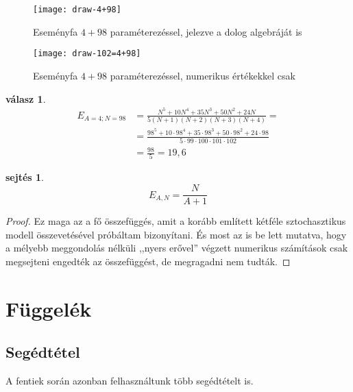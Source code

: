 \documentclass{article}
\newtheorem{answer}{válasz}
\newtheorem{conjecture}{sejtés}
\newcommand{\parenthesed}[1]{\left(#1\right)}
\begin{document}
	\begin{figure}[H]
		\caption*{Eseményfa $4+98$ paraméterezéssel, jelezve a dolog algebráját is}
		\centering
		\texttt{[image: draw-4+98]}
	\end{figure}

	\begin{figure}[H]
		\caption*{Eseményfa $4+98$ paraméterezéssel, numerikus értékekkel csak}
		\centering
		\texttt{[image: draw-102=4+98]}
	\end{figure}

	\begin{answer}
		\begin{align*}
			E_{A=4;N=98} &= \frac{N^5 + 10N^4 + 35N^3 +50N^2 + 24N}{5\parenthesed{N+1}\parenthesed{N+2}\parenthesed{N+3}\parenthesed{N+4}} =\\
			             &= \frac{98^5 + 10\cdot98^4 + 35\cdot98^3 +50\cdot98^2 + 24\cdot98}{5\cdot99\cdot100\cdot101\cdot102}\\
			             &= \frac{98}5 = 19,6
		\end{align*}
	\end{answer}

	\begin{conjecture}
		\[
			E_{A,N} = \frac N{A+1}
		\]
	\end{conjecture}
	\begin{proof}
		Ez maga az a fő összefüggés, amit a korább említett kétféle sztochasztikus modell összevetésével próbáltam bizonyítani.
		És most az is be lett mutatva, hogy a mélyebb meggondolás nélküli ,,nyers erővel'' végzett numerikus számítások csak megsejteni engedték az összefüggést, de megragadni nem tudták.
	\end{proof}

	\section{Függelék}

	\subsection{Segédtétel}

	A fentiek során azonban felhasználtunk több segédtételt is.
\end{document}
